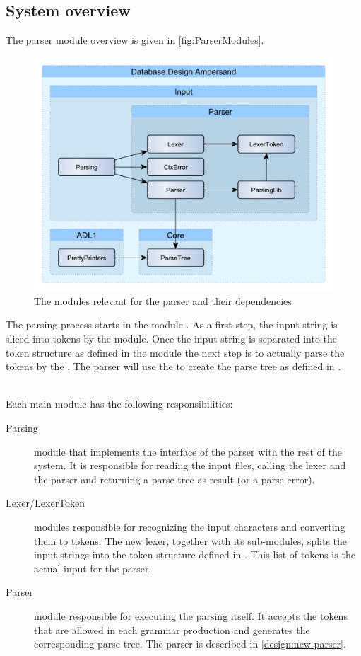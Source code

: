 
\subsection{System overview}
\label{design:system-overview}
  The parser module overview is given in \autoref{fig:ParserModules}.
  \begin{figure}[ht]%
    \centering
    \includegraphics[width=0.7\columnwidth]{Figures/ParserModules}
    \caption{The modules relevant for the parser and their dependencies}
    \label{fig:ParserModules}
  \end{figure}%

  The parsing process starts in the module .
  As a first step, the input string is sliced into tokens by the  module.
  Once the input string is separated into the token structure as defined in the module  the next step is to actually parse the tokens by the .
  The parser will use the  to create the parse tree as defined in .

  ~\\\noindent
  Each main module has the following responsibilities:
  \begin{description}
    \item[Parsing] module that implements the interface of the parser with the rest of the system.
      It is responsible for reading the input files, calling the lexer and the parser and returning a parse tree as result (or a parse error).

    \item[Lexer/LexerToken] modules responsible for recognizing the input characters and converting them to tokens.
      The new lexer, together with its sub-modules, splits the input strings into the token structure defined in .
      This list of tokens is the actual input for the parser.

    \item[Parser] module responsible for executing the parsing itself.
      It accepts the tokens that are allowed in each grammar production and generates the corresponding parse tree.
      The parser is described in \autoref{design:new-parser}.
 \end{description}

